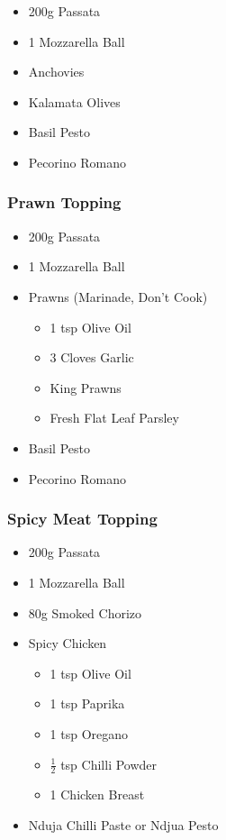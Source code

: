 \documentclass[11pt, english]{article}
\begin{document}
	\begin{itemize}
        \setlength\itemsep{0cm}
                \item 200g Passata
		\item 1 Mozzarella Ball
                \item Anchovies
		\item Kalamata Olives
		\item Basil Pesto
		\item Pecorino Romano
        \end{itemize}

		\subsubsection*{Prawn Topping}

	\begin{itemize}
        \setlength\itemsep{0cm}
                \item 200g Passata
		\item 1 Mozzarella Ball
		\item Prawns (Marinade, Don't Cook)
		\begin{itemize}
			\item 1 tsp Olive Oil
                	\item 3 Cloves Garlic
			\item King Prawns
			\item Fresh Flat Leaf Parsley
		\end{itemize}
		\item Basil Pesto
		\item Pecorino Romano
        \end{itemize}

		\subsubsection*{Spicy Meat Topping}
	
	\begin{itemize}
        \setlength\itemsep{0cm}
                \item 200g Passata
		\item 1 Mozzarella Ball
		\item 80g Smoked Chorizo
		\item Spicy Chicken 
		\begin{itemize}
			\item 1 tsp Olive Oil
			\item 1 tsp Paprika
			\item 1 tsp Oregano
			\item $\frac{1}{2}$ tsp Chilli Powder
			\item 1 Chicken Breast
		\end{itemize}
		\item Nduja Chilli Paste or Ndjua Pesto
        \end{itemize}
\end{document}
